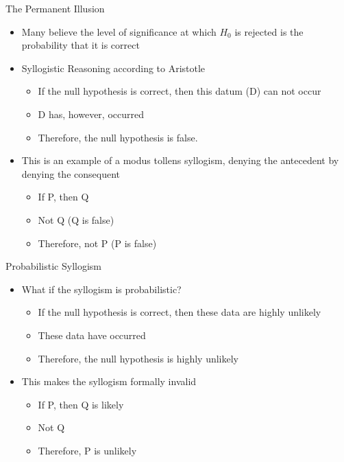 \documentclass[aspectratio=169, 12pt]{beamer}
\begin{document}
\begin{frame}{The Permanent Illusion}
  \begin{itemize}
  \item Many believe the level of significance at which $H_0$ is rejected is the probability that it is correct 
  \item Syllogistic Reasoning according to Aristotle
	 \begin{itemize}
 	 \item If the null hypothesis is correct, then this datum (D) can not occur
	 \item D has, however, occurred
          \item Therefore, the null hypothesis is false.
 	 \end{itemize}
\item This is an example of a modus tollens syllogism, denying the antecedent by denying the consequent
	 \begin{itemize}
 	 \item If P, then Q 
	 \item Not Q (Q is false)
          \item Therefore, not P (P is false)
 	 \end{itemize}
  \end{itemize}
\end{frame}

\begin{frame}{Probabilistic Syllogism}
  \begin{itemize}
  \item What if the syllogism is probabilistic?
    \begin{itemize}
    \item If the null hypothesis is correct, then these data are highly unlikely
    \item These data have occurred
    \item Therefore, the null hypothesis is highly unlikely
    \end{itemize}
  \item This makes the syllogism formally invalid %
	 \begin{itemize}
 	 \item If P, then Q is likely
	 \item Not Q
          \item Therefore, P is unlikely
 	 \end{itemize}
  \end{itemize}
\end{frame}
\end{document}
